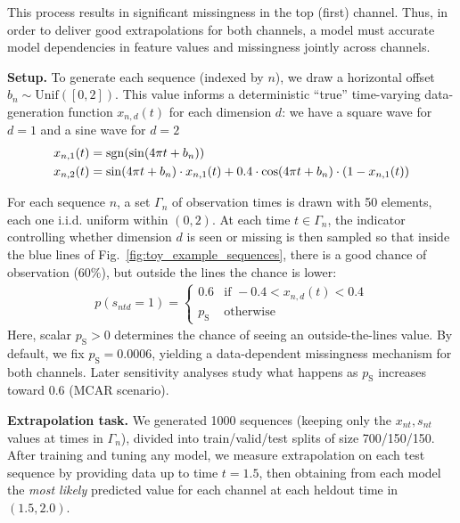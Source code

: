 This process results in significant missingness in the top (first) channel. Thus, in order to deliver good extrapolations for both channels, a model must accurate model dependencies in feature values and missingness jointly across channels.

\textbf{Setup.}
To generate each sequence (indexed by $n$), we draw a horizontal offset $b_n \sim \text{Unif}([0,2])$. 
This value informs a deterministic ``true'' time-varying data-generation function $x_{n,d}(t)$ for each dimension $d$: we have a square wave for $d=1$ and a sine wave for $d=2$ 
\begin{align}
    x_{n,1}(t) &= \operatorname{sgn}(\sin(4\pi t+b_n))
    \\ \notag 
    x_{n,2}(t) &= \sin(4\pi t+b_n) \cdot x_{n,1}(t)
    + 0.4 \cdot \cos(4\pi t+b_n) \cdot (1-x_{n,1}(t))
\label{eq:gen_data_toy_eq}
\end{align}

For each sequence $n$, a set $\Gamma_n$ of observation times is drawn with 50 elements, each one i.i.d. uniform within $(0, 2)$. At each time $t \in \Gamma_n$, the indicator controlling whether dimension $d$ is seen or missing is then sampled so that inside the blue lines of Fig.~\ref{fig:toy_example_sequences}, there is a good chance of observation (60\%), but outside the lines the chance is lower:
\begin{align}
     p( s_{ntd} = 1 ) =
 \begin{cases}
 0.6 & \text{if } -0.4 < x_{n,d}(t) < 0.4 \\
 p_{\text{S}} & \text{otherwise }
 \end{cases}    
 \label{eq:seen_proba_toy}
\end{align}
Here, scalar $p_{\text{S}} {>} 0$ determines the chance of seeing an outside-the-lines value. By default, we fix $p_{\text{S}} {=} 0.0006$, yielding a data-dependent missingness mechanism for both channels. 
Later sensitivity analyses study what happens as $p_{\text{S}}$ increases toward 0.6 (MCAR scenario).


\textbf{Extrapolation task.}
We generated 1000 sequences (keeping only the $x_{nt}, s_{nt}$ values at times in $\Gamma_n$), divided into train/valid/test splits of size 700/150/150. 
After training and tuning any model, we measure extrapolation on each test sequence by providing data up to time $t=1.5$, then obtaining from each model the \emph{most likely} predicted value for each channel at each heldout time in $(1.5, 2.0)$.



